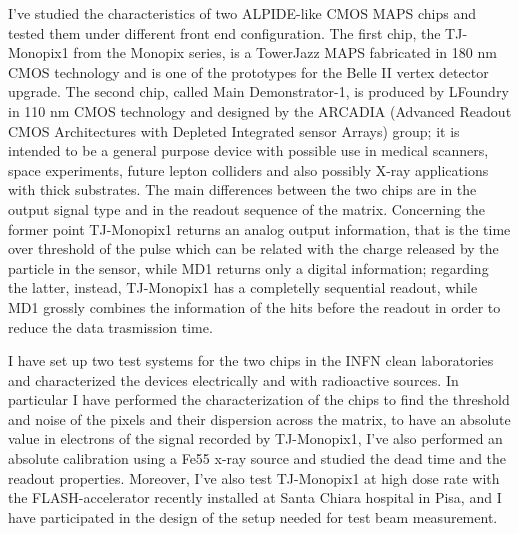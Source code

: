 I've studied the characteristics of two ALPIDE-like CMOS MAPS chips and tested them under different front end configuration. The first chip, the TJ-Monopix1 from the Monopix series, is a TowerJazz MAPS fabricated in 180 nm CMOS technology and is one of the prototypes for the Belle II vertex detector upgrade. The second chip, called Main Demonstrator-1, is produced by LFoundry in 110 nm CMOS technology and designed by the ARCADIA (Advanced Readout CMOS Architectures with Depleted Integrated sensor Arrays) group; it is intended to be a general purpose device with possible use in medical scanners, space experiments, future lepton colliders and also possibly X-ray applications with thick substrates.  
The main differences between the two chips are in the output signal type and in the readout sequence of the matrix. Concerning the former point TJ-Monopix1 returns an analog output information, that is the time over threshold of the pulse which can be related with the charge released by the particle in the sensor, while MD1 returns only a digital information; regarding the latter, instead, TJ-Monopix1 has a completelly sequential readout, while MD1 grossly combines the information of the hits before the readout in order to reduce the data trasmission time.

I have set up two test systems for the two chips in the INFN clean laboratories and characterized the devices electrically and with radioactive sources. 
In particular I have performed the characterization of the chips to find the threshold and noise of the pixels and their dispersion across the matrix, to have an absolute value in electrons of the signal recorded by TJ-Monopix1, I've also performed an absolute calibration using a Fe55 x-ray source and studied the dead time and the readout properties. 
Moreover, I've also test TJ-Monopix1 at high dose rate with the FLASH-accelerator recently installed at Santa Chiara hospital in Pisa, and I have participated in the design of the setup needed for test beam measurement.



